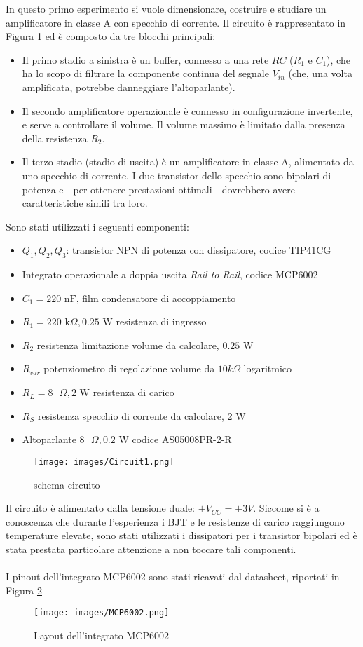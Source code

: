 In questo primo esperimento si vuole dimensionare, costruire e studiare un amplificatore in classe A con specchio di corrente. Il circuito è rappresentato in Figura \ref{fig:Circuit1} ed è composto da tre blocchi principali:
\begin{itemize}\label{ch:Spiegazione1}
    \item Il primo stadio a sinistra è un buffer, connesso a una rete $RC$ ($R_1$ e $C_1$), che ha lo scopo di filtrare la componente continua del segnale $V_{in}$ (che, una volta amplificata, potrebbe danneggiare l’altoparlante).
    \item Il secondo amplificatore operazionale è connesso in configurazione invertente, e serve a controllare il volume. Il volume massimo è limitato dalla presenza della resistenza $R_2$.
    \item Il terzo stadio (stadio di uscita) è un amplificatore in classe A, alimentato da uno specchio di corrente. I due transistor dello specchio sono bipolari di potenza e - per ottenere prestazioni ottimali - dovrebbero avere caratteristiche simili tra loro. 
\end{itemize}
Sono stati utilizzati i seguenti componenti:
\begin{itemize}
    \item $Q_1,Q_2,Q_3$: transistor NPN di potenza con dissipatore, codice TIP41CG
    \item Integrato operazionale a doppia uscita \textit{Rail to Rail}, codice MCP6002
    \item $C_1=220\text{ nF}$, film condensatore di accoppiamento
    \item $R_1=220\text{ k}\Omega, 0.25\text{ W}$ resistenza di ingresso
    \item $R_2$ resistenza limitazione volume da calcolare, $0.25\text{ W}$
    \item $R_{var}$ potenziometro di regolazione volume da $10k\Omega$ logaritmico
    \item $R_L=8\text{ }\Omega,2\text{ W}$ resistenza di carico
    \item $R_S$ resistenza specchio di corrente da calcolare, 2 W
    \item Altoparlante $8\text{ }\Omega,0.2\text{ W}$ codice AS05008PR-2-R
\end{itemize}
\begin{figure}[H]
    \centering
    \texttt{[image: images/Circuit1.png]}
    \caption{schema circuito}
    \label{fig:Circuit1}
\end{figure}
Il circuito è alimentato dalla tensione duale: $\pm V_{CC}=\pm 3V$. Siccome si è a conoscenza che durante l'esperienza i BJT e le resistenze di carico raggiungono temperature elevate, sono stati utilizzati i dissipatori per i transistor bipolari ed è stata prestata particolare attenzione a non toccare tali componenti.\\\\
I pinout dell'integrato MCP6002 sono stati ricavati dal datasheet, riportati in Figura \ref{fig:MCP6002}
\begin{figure}[H]
    \centering
    \texttt{[image: images/MCP6002.png]}
    \caption{Layout dell'integrato MCP6002 }
    \label{fig:MCP6002}
\end{figure}
